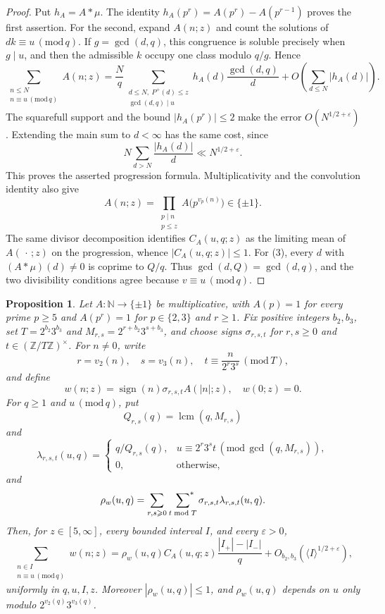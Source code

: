 \documentclass[12pt,reqno]{amsart}
\numberwithin{equation}{section}
\newtheorem{proposition}[theorem]{Proposition}
\theoremstyle{definition}
\renewcommand{\le}{\leqslant}
\renewcommand{\ge}{\geqslant}
\newcommand{\sumstar}{\sideset{}{^*}\sum}
\newcommand{\ZZ}{\mathbb{Z}}
\newcommand{\NN}{\mathbb{N}}
\DeclareMathOperator{\sign}{sign}
\renewcommand{\pmod}[1]{\,(\mathrm{mod}\,#1)}
\begin{document}
\begin{proof}
Put $h_A=A*\mu$.
The identity $h_A(p^r)=A(p^r)-A(p^{r-1})$ proves the first assertion.
For the second, expand $A(n;z)$ and count the solutions of $dk\equiv u\pmod q$.
If $g=\gcd(d,q)$, this congruence is soluble precisely when $g\mid u$, and then the admissible $k$ occupy one class modulo $q/g$.
Hence
\[
\sum_{\substack{n\le N\\n\equiv u\pmod q}}A(n;z)
=\frac Nq\sum_{\substack{d\le N,\ P^+(d)\le z\\\gcd(d,q)\mid u}}
h_A(d)\frac{\gcd(d,q)}d
+O\left(\sum_{d\le N}|h_A(d)|\right).
\]
The squarefull support and the bound $|h_A(p^r)|\le2$ make the error $O(N^{1/2+\varepsilon})$.
Extending the main sum to $d<\infty$ has the same cost, since
\[
N\sum_{d>N}\frac{|h_A(d)|}{d}
\ll N^{1/2+\varepsilon}.
\]
This proves the asserted progression formula.
Multiplicativity and the convolution identity also give
\[
A(n;z)=\prod_{\substack{p\mid n\\p\le z}}A\bigl(p^{v_p(n)}\bigr)\in\{\pm1\}.
\]
The same divisor decomposition identifies $C_A(u,q;z)$ as the limiting mean of $A(\,\cdot\,;z)$ on the progression, whence $|C_A(u,q;z)|\le1$.
For (3), every $d$ with $(A*\mu)(d)\ne0$ is coprime to $Q/q$.
Thus $\gcd(d,Q)=\gcd(d,q)$, and the two divisibility conditions agree because $v\equiv u\pmod q$.
\end{proof}

\begin{proposition}\label{prop:cell-progressions}
Let $A:\NN\to\{\pm1\}$ be multiplicative, with $A(p)=1$ for every prime $p\ge5$ and $A(p^r)=1$ for $p\in\{2,3\}$ and $r\ge1$.
Fix positive integers $b_2,b_3$, set $T=2^{b_2}3^{b_3}$ and $M_{r,s}=2^{r+b_2}3^{s+b_3}$, and choose signs $\sigma_{r,s,t}$ for $r,s\ge0$ and $t\in(\ZZ/T\ZZ)^\times$.
For $n\ne0$, write
\[
r=v_2(n),\quad s=v_3(n),\quad
t\equiv \frac{n}{2^r3^s}\pmod T,
\]
and define
\[
w(n;z)=\sign(n)\sigma_{r,s,t}A(|n|;z),\quad w(0;z)=0.
\]
For $q\ge1$ and $u\pmod q$, put
\[
Q_{r,s}(q)=\operatorname{lcm}(q,M_{r,s})
\]
and
\[
\lambda_{r,s,t}(u,q)=
\begin{cases}
q/Q_{r,s}(q),&u\equiv2^r3^s t\pmod{\gcd(q,M_{r,s})},\\
0,&\text{otherwise},
\end{cases}
\]
and
\[
\rho_w(u,q)=\sum_{r,s\ge0}\ \sumstar_{t\bmod T}
\sigma_{r,s,t}\lambda_{r,s,t}(u,q).
\]
Then, for $z\in[5,\infty]$, every bounded interval $I$, and every $\varepsilon>0$,
\[
\sum_{\substack{n\in I\\n\equiv u\pmod q}}w(n;z)
=\rho_w(u,q)C_A(u,q;z)\frac{|I_+|-|I_-|}{q}
+O_{b_2,b_3}(\langle I\rangle^{1/2+\varepsilon}),
\]
uniformly in $q,u,I,z$.
Moreover $|\rho_w(u,q)|\le1$, and $\rho_w(u,q)$ depends on $u$ only modulo $2^{v_2(q)}3^{v_3(q)}$.
\end{proposition}
\end{document}
